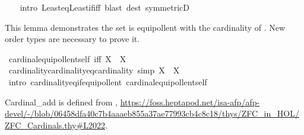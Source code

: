 \begin{isabellebody}
\ \ \isamarkupfalse%
\ {\isacharparenleft}{\kern0pt}intro\ Least{\isacharunderscore}{\kern0pt}eq{\isacharunderscore}{\kern0pt}Least{\isacharunderscore}{\kern0pt}if{\isacharunderscore}{\kern0pt}iff{\isacharparenright}{\kern0pt}\ {\isacharparenleft}{\kern0pt}blast\ dest{\isacharcolon}{\kern0pt}\ symmetricD{\isacharparenright}{\kern0pt}%
\endisatagproof
{\isafoldproof}%
%
\isadelimproof
%
\endisadelimproof
%
\begin{isamarkuptext}%
This lemma demonstrates the set  is equipollent with the cardinality of .
New order types are necessary to prove it.%
\end{isamarkuptext}\isamarkuptrue%
\isamarkupfalse%
\ cardinal{\isacharunderscore}{\kern0pt}equipollent{\isacharunderscore}{\kern0pt}self\ {\isacharbrackleft}{\kern0pt}iff{\isacharbrackright}{\kern0pt}{\isacharcolon}{\kern0pt}\ {\isachardoublequoteopen}{\isacharbar}{\kern0pt}X{\isacharbar}{\kern0pt}\ {\isasymapprox}\ X{\isachardoublequoteclose}\isanewline
%
\isadelimproof
\ \ %
\endisadelimproof
%
\isatagproof
{}\isamarkupfalse%
%
\endisatagproof
{\isafoldproof}%
%
\isadelimproof
\isanewline
%
\endisadelimproof
\isanewline
{}\isamarkupfalse%
\ cardinality{\isacharunderscore}{\kern0pt}cardinality{\isacharunderscore}{\kern0pt}eq{\isacharunderscore}{\kern0pt}cardinality\ {\isacharbrackleft}{\kern0pt}simp{\isacharbrackright}{\kern0pt}{\isacharcolon}{\kern0pt}\ {\isachardoublequoteopen}{\isacharbar}{\kern0pt}{\isacharbar}{\kern0pt}X{\isacharbar}{\kern0pt}{\isacharbar}{\kern0pt}\ {\isacharequal}{\kern0pt}\ {\isacharbar}{\kern0pt}X{\isacharbar}{\kern0pt}{\isachardoublequoteclose}\isanewline
%
\isadelimproof
\ \ %
\endisadelimproof
%
\isatagproof
{}\isamarkupfalse%
\ {\isacharparenleft}{\kern0pt}intro\ cardinality{\isacharunderscore}{\kern0pt}eq{\isacharunderscore}{\kern0pt}if{\isacharunderscore}{\kern0pt}equipollent\ cardinal{\isacharunderscore}{\kern0pt}equipollent{\isacharunderscore}{\kern0pt}self{\isacharparenright}{\kern0pt}%
\endisatagproof
{\isafoldproof}%
%
\isadelimproof
%
\endisadelimproof
%
\isadelimdocument
%
\endisadelimdocument
%
\isatagdocument
%
\isamarkuptrue%
%
\endisatagdocument
{\isafolddocument}%
%
\isadelimdocument
%
\endisadelimdocument
%
\begin{isamarkuptext}%
Cardinal\_add is defined from \cite{ZFC_in_HOL_AFP}, 
\url{https://foss.heptapod.net/isa-afp/afp-devel/-/blob/06458dfa40c7b4aaaeb855a37ae77993cb4c8c18/thys/ZFC_in_HOL/ZFC_Cardinals.thy\#L2022}.

\end{isamarkuptext}
\end{isabellebody}

